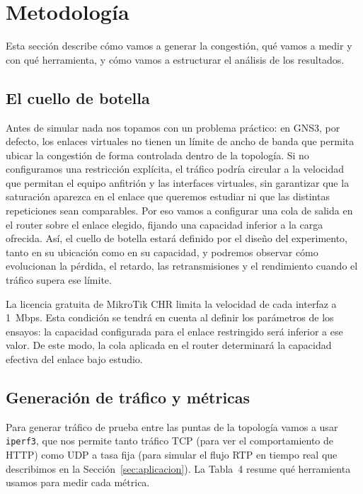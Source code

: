 \documentclass[11pt,a4paper]{article}
\begin{document}
\clearpage
\section{Metodolog\'ia}
\label{sec:metodologia}

Esta secci\'on describe c\'omo vamos a generar la congesti\'on, qu\'e vamos a medir y con qu\'e herramienta, y c\'omo vamos a estructurar el an\'alisis de los resultados.

\subsection*{El cuello de botella}

Antes de simular nada nos topamos con un problema pr\'actico: en GNS3, por defecto, los enlaces virtuales no tienen un l\'imite de ancho de banda que permita ubicar la congesti\'on de forma controlada dentro de la topolog\'ia. Si no configuramos una restricci\'on expl\'icita, el tr\'afico podr\'ia circular a la velocidad que permitan el equipo anfitri\'on y las interfaces virtuales, sin garantizar que la saturaci\'on aparezca en el enlace que queremos estudiar ni que las distintas repeticiones sean comparables. Por eso vamos a configurar una cola de salida en el router sobre el enlace elegido, fijando una capacidad inferior a la carga ofrecida. As\'i, el cuello de botella estar\'a definido por el dise\~no del experimento, tanto en su ubicaci\'on como en su capacidad, y podremos observar c\'omo evolucionan la p\'erdida, el retardo, las retransmisiones y el rendimiento cuando el tr\'afico supera ese l\'imite.

La licencia gratuita de MikroTik CHR limita la velocidad de cada interfaz a 1~Mbps. Esta condici\'on se tendr\'a en cuenta al definir los par\'ametros de los ensayos: la capacidad configurada para el enlace restringido ser\'a inferior a ese valor. De este modo, la cola aplicada en el router determinar\'a la capacidad efectiva del enlace bajo estudio.

\subsection*{Generaci\'on de tr\'afico y m\'etricas}

Para generar tr\'afico de prueba entre las puntas de la topolog\'ia vamos a usar \texttt{iperf3}, que nos permite tanto tr\'afico TCP (para ver el comportamiento de HTTP) como UDP a tasa fija (para simular el flujo RTP en tiempo real que describimos en la Secci\'on~\ref{sec:aplicacion}). La Tabla~4 resume qu\'e herramienta usamos para medir cada m\'etrica.
\end{document}

